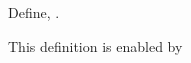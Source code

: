 \begin{definition}
  Define, \evcdef.%
\end{definition}

\begin{justification}
  This definition is enabled by %
\end{justification}
